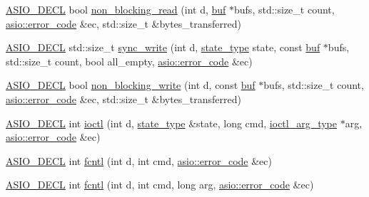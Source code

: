 \begin{DoxyCompactItemize}
\item 
\hyperlink{config_8hpp_ab54d01ea04afeb9a8b39cfac467656b7}{A\+S\+I\+O\+\_\+\+D\+E\+C\+L} bool \hyperlink{namespaceasio_1_1detail_1_1descriptor__ops_a3b54b218ce98d1842878e7562b49537f}{non\+\_\+blocking\+\_\+read} (int d, \hyperlink{namespaceasio_1_1detail_1_1descriptor__ops_ad10e658a754ff775cdcc3b3decd3c8c9}{buf} $\ast$bufs, std\+::size\+\_\+t count, \hyperlink{classasio_1_1error__code}{asio\+::error\+\_\+code} \&ec, std\+::size\+\_\+t \&bytes\+\_\+transferred)
\item 
\hyperlink{config_8hpp_ab54d01ea04afeb9a8b39cfac467656b7}{A\+S\+I\+O\+\_\+\+D\+E\+C\+L} std\+::size\+\_\+t \hyperlink{namespaceasio_1_1detail_1_1descriptor__ops_adfa229766b01ecb438e199e3f69f386a}{sync\+\_\+write} (int d, \hyperlink{namespaceasio_1_1detail_1_1descriptor__ops_a773b997617ef697b51ff3f91f6e48764}{state\+\_\+type} state, const \hyperlink{namespaceasio_1_1detail_1_1descriptor__ops_ad10e658a754ff775cdcc3b3decd3c8c9}{buf} $\ast$bufs, std\+::size\+\_\+t count, bool all\+\_\+empty, \hyperlink{classasio_1_1error__code}{asio\+::error\+\_\+code} \&ec)
\item 
\hyperlink{config_8hpp_ab54d01ea04afeb9a8b39cfac467656b7}{A\+S\+I\+O\+\_\+\+D\+E\+C\+L} bool \hyperlink{namespaceasio_1_1detail_1_1descriptor__ops_aad77004eb99a79b6cd448ce6d1482ad9}{non\+\_\+blocking\+\_\+write} (int d, const \hyperlink{namespaceasio_1_1detail_1_1descriptor__ops_ad10e658a754ff775cdcc3b3decd3c8c9}{buf} $\ast$bufs, std\+::size\+\_\+t count, \hyperlink{classasio_1_1error__code}{asio\+::error\+\_\+code} \&ec, std\+::size\+\_\+t \&bytes\+\_\+transferred)
\item 
\hyperlink{config_8hpp_ab54d01ea04afeb9a8b39cfac467656b7}{A\+S\+I\+O\+\_\+\+D\+E\+C\+L} int \hyperlink{namespaceasio_1_1detail_1_1descriptor__ops_afed8890fa05f9b932b50dcff81d5b659}{ioctl} (int d, \hyperlink{namespaceasio_1_1detail_1_1descriptor__ops_a773b997617ef697b51ff3f91f6e48764}{state\+\_\+type} \&state, long cmd, \hyperlink{namespaceasio_1_1detail_a27f72e1b8b785eaaa59ddc6b41751106}{ioctl\+\_\+arg\+\_\+type} $\ast$arg, \hyperlink{classasio_1_1error__code}{asio\+::error\+\_\+code} \&ec)
\item 
\hyperlink{config_8hpp_ab54d01ea04afeb9a8b39cfac467656b7}{A\+S\+I\+O\+\_\+\+D\+E\+C\+L} int \hyperlink{namespaceasio_1_1detail_1_1descriptor__ops_a50ecc1bb18d53d214abfeca6ceb9bc4f}{fcntl} (int d, int cmd, \hyperlink{classasio_1_1error__code}{asio\+::error\+\_\+code} \&ec)
\item 
\hyperlink{config_8hpp_ab54d01ea04afeb9a8b39cfac467656b7}{A\+S\+I\+O\+\_\+\+D\+E\+C\+L} int \hyperlink{namespaceasio_1_1detail_1_1descriptor__ops_a2db735e0f86e600494183bcabbc3d5b1}{fcntl} (int d, int cmd, long arg, \hyperlink{classasio_1_1error__code}{asio\+::error\+\_\+code} \&ec)

\end{DoxyCompactItemize}
